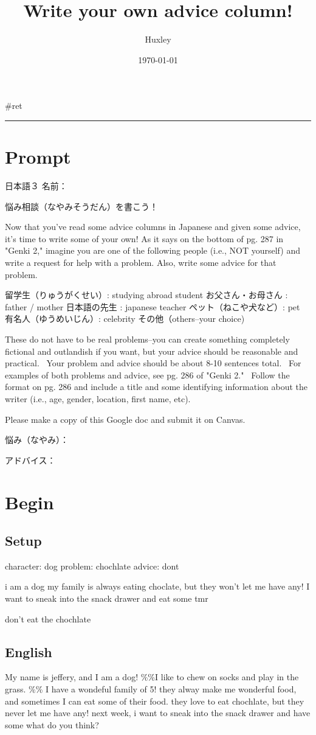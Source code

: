 \documentclass[letterpaper]{article}
\author{Huxley}
\date{\today}
\title{Write your own advice column!}
\renewcommand{\tableofcontents}{}
\begin{document}
\tableofcontents

\#ret

\noindent\rule{\textwidth}{0.5pt}

\section{Prompt}
\label{sec:org5162f6f}
日本語３ 名前：

悩み相談（なやみそうだん）を書こう！

Now that you've read some advice columns in Japanese and given some
advice, it's time to write some of your own! As it says on the bottom of
pg. 287 in "Genki 2," imagine you are one of the following people (i.e.,
NOT yourself) and write a request for help with a problem. Also, write
some advice for that problem.

留学生（りゅうがくせい）: studying abroad student お父さん・お母さん :
father / mother 日本語の先生 : japanese teacher ペット（ねこや犬など）:
pet 有名人（ゆうめいじん）: celebrity その他（others--your choice)

These do not have to be real problems--you can create something
completely fictional and outlandish if you want, but your advice should
be reasonable and practical.  Your problem and advice should be about
8-10 sentences total.  For examples of both problems and advice, see pg.
286 of "Genki 2."  Follow the format on pg. 286 and include a title and
some identifying information about the writer (i.e., age, gender,
location, first name, etc).

Please make a copy of this Google doc and submit it on Canvas.

悩み（なやみ）：

アドバイス：

\section{Begin}
\label{sec:org91ce3d7}
\subsection{Setup}
\label{sec:org51d1234}
character: dog problem: chochlate advice: dont

i am a dog my family is always eating choclate, but they won't let me
have any! I want to sneak into the snack drawer and eat some tmr

don't eat the chochlate

\subsection{English}
\label{sec:org55a64dd}
My name is jeffery, and I am a dog! \%\%I like to chew on socks and play
in the grass. \%\% I have a wondeful family of 5! they alway make me
wonderful food, and sometimes I can eat some of their food. they love to
eat chochlate, but they never let me have any! next week, i want to
sneak into the snack drawer and have some what do you think?
\end{document}
